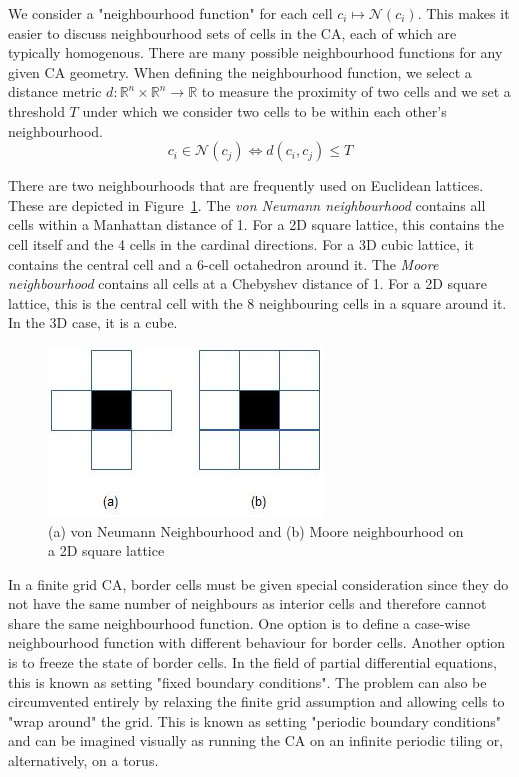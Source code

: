 We consider a "neighbourhood function" for each cell $c_i \mapsto \mathcal{N}(c_i)$. This makes it easier to discuss neighbourhood sets of cells in the CA, each of which are typically homogenous. There are many possible neighbourhood functions for any given CA geometry. When defining the neighbourhood function, we select a distance metric $d:\mathbb{R}^n \times \mathbb{R}^n \to \mathbb{R}$ to measure the proximity of two cells and we set a threshold $T$ under which we consider two cells to be within each other's neighbourhood.
\begin{equation}
  c_i \in \mathcal{N}(c_j) \iff d(c_i, c_j) \leq T
\end{equation}

There are two neighbourhoods that are frequently used on Euclidean lattices. These are depicted in Figure~\ref{fig:neighbourhoods}. The \textit{von Neumann neighbourhood} contains all cells within a Manhattan distance of 1. For a 2D square lattice, this contains the cell itself and the 4 cells in the cardinal directions. For a 3D cubic lattice, it contains the central cell and a 6-cell octahedron around it. The \textit{Moore neighbourhood} contains all cells at a Chebyshev distance of 1. For a 2D square lattice, this is the central cell with the 8 neighbouring cells in a square around it. In the 3D case, it is a cube.\\

\begin{figure}[!h]
\centering
\includegraphics[width=.3\textwidth]{images/neighbourhoods.png}
\caption{(a) von Neumann Neighbourhood and (b) Moore neighbourhood on a 2D square lattice \cite{debasis2011survey}}
\label{fig:neighbourhoods}
\end{figure}

In a finite grid CA, border cells must be given special consideration since they do not have the same number of neighbours as interior cells and therefore cannot share the same neighbourhood function. One option is to define a case-wise neighbourhood function with different behaviour for border cells. Another option is to freeze the state of border cells. In the field of partial differential equations, this is known as setting "fixed boundary conditions".  The problem can also be circumvented entirely by relaxing the finite grid assumption and allowing cells to "wrap around" the grid. This is known as setting "periodic boundary conditions" and can be imagined visually as running the CA on an infinite periodic tiling or, alternatively, on a torus.


